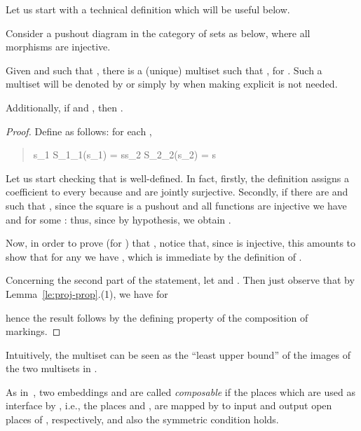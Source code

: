 \documentclass{LMCS}
\begin{document}
Let us start with a technical definition which will be useful below. 

\begin{prop}
  \label{pr:sum-mark}
  Consider a pushout diagram in the category of sets as below, where all
  morphisms are injective. 

  \noindent
  \begin{minipage}[c]{0.63\linewidth}
    Given  and  such
    that , there is a (unique)
    multiset  such that , for .  Such a multiset  will be
    denoted by  or simply by  when making  explicit is not needed.
  \end{minipage}
  \begin{minipage}[c]{0.36\linewidth}
    \vspace{-5mm}
    
  \end{minipage}
  
  \smallskip

  Additionally, if  and , then .
\end{prop}

\begin{proof} 
Define  as follows: for
  each , 
\begin{quote}
\exists s_1 \in S_1\alpha_1(s_1) = s\exists s_2 \in S_2\alpha_2(s_2) = s
\end{quote}
\smallskip
Let us start checking that  is well-defined. In fact, firstly, the
definition assigns a coefficient to every 
because  and  are jointly surjective. Secondly, if
there are  and  such
that , since the square is a pushout and
all functions are injective we have  and
 for some : thus, 
since  by hypothesis, we obtain .

Now, in order to prove (for ) that
, notice that, since  is injective,
this amounts to show that for any  we have , which is immediate by the definition of .

    Concerning the second part of the statement, let  and
  . Then just observe that by
  Lemma~\ref{le:proj-prop}.(1), we have for 
  \begin{quote}
    
  \end{quote}
  hence the result  follows by the defining property of the
  composition of markings. 
\end{proof}

Intuitively, the multiset  can be seen as the
``least upper bound'' of the images of the two multisets in
.

As in~\cite{BCEH:CMRS,BCEH:CSOP}, two embeddings  and  are called \emph{composable} if the places
which are used as interface by , i.e., the places  and
, are mapped by  to input and output open places of ,
respectively, and also the symmetric condition holds.
\end{document}
